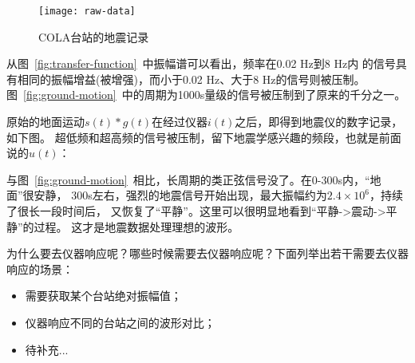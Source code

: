 \begin{figure}[H]
\centering
\texttt{[image: raw-data]}
\caption{COLA台站的地震记录}
\end{figure}

从图~\ref{fig:transfer-function}~中振幅谱可以看出，频率在0.02 Hz到8 Hz内
的信号具有相同的振幅增益(被增强)，而小于0.02 Hz、大于8 Hz的信号则被压制。
图~\ref{fig:ground-motion}~中的周期为1000s量级的信号被压制到了原来的千分之一。

原始的地面运动$s(t)*g(t)$在经过仪器$i(t)$之后，即得到地震仪的数字记录，如下图。
超低频和超高频的信号被压制，留下地震学感兴趣的频段，也就是前面说的$u(t)$：

与图~\ref{fig:ground-motion}~相比，长周期的类正弦信号没了。在0-300s内，“地面”很安静，
300s左右，强烈的地震信号开始出现，最大振幅约为$2.4\times10^6$，持续了很长一段时间后，
又恢复了“平静”。这里可以很明显地看到“平静->震动->平静”的过程。
这才是地震数据处理理想的波形。

为什么要去仪器响应呢？哪些时候需要去仪器响应呢？下面列举出若干需要去仪器响应的场景：
\begin{itemize}
\item 需要获取某个台站绝对振幅值；
\item 仪器响应不同的台站之间的波形对比；
\item 待补充...
\end{itemize}
